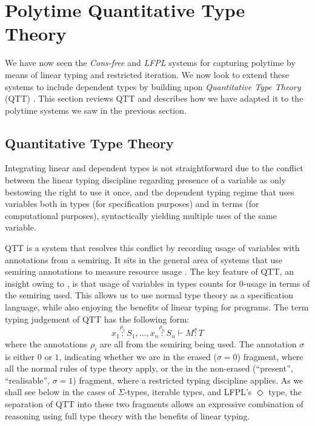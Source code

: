 \documentclass[acmsmall,screen]{acmart}
\begin{document}
\section{Polytime Quantitative Type Theory}
\label{sec:qtt}

We have now seen the \emph{Cons-free} and \emph{LFPL} systems for
capturing polytime by means of linear typing and restricted
iteration. We now look to extend these systems to include dependent
types by building upon \emph{Quantitative Type Theory} (QTT)
\cite{atkey18qtt,mcbride16}. This section reviews QTT and describes
how we have adapted it to the polytime systems we saw in the previous
section.

\subsection{Quantitative Type Theory}
\label{sec:qtt-basic}

Integrating linear and dependent types is not straightforward due to
the conflict between the linear typing discipline regarding presence
of a variable as only bestowing the right to use it once, and the
dependent typing regime that uses variables both in types (for
specification purposes) and in terms (for computational purposes),
syntactically yielding multiple uses of the same variable.

QTT is a system that resolves this conflict by recording usage of
variables with annotations from a semiring. It sits in the general
area of systems that use semiring annotations to measure resource usage
\cite{BrunelGMZ14,GhicaS14,OrchardLE19}. The key feature of QTT, an
insight owing to \citet{mcbride16}, is that usage of variables in
types counts for $0$-usage in terms of the semiring used. This allows
us to use normal type theory as a specification language, while also
enjoying the benefits of linear typing for programs. The term typing
judgement of QTT has the following form:
\begin{displaymath}
  x_1 \stackrel{\rho_1}: S_1, \dots, x_n \stackrel{\rho_n}: S_n \vdash M \stackrel\sigma: T
\end{displaymath}
where the annotations $\rho_i$ are all from the semiring being
used. The annotation $\sigma$ is either $0$ or $1$, indicating whether
we are in the erased ($\sigma = 0$) fragment, where all the normal
rules of type theory apply, or the in the non-erased (``present'',
``realisable'', $\sigma = 1$) fragment, where a restricted typing
discipline applies.  As we shall see below in the cases of
$\Sigma$-types, iterable types, and LFPL's $\Diamond$ type, the
separation of QTT into these two fragments allows an expressive
combination of reasoning using full type theory with the benefits of
linear typing.
\end{document}
